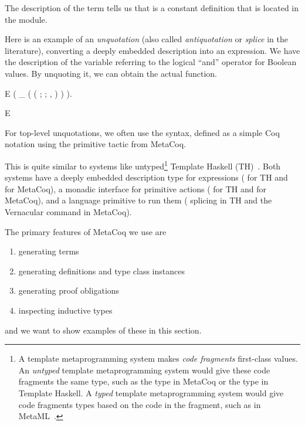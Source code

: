 The description of the term  tells us that  is a constant definition that is located in the  module.

Here is an example of an \emph{\gls{unquotation}} (also called \emph{antiquotation} or \emph{splice} in the literature), converting a deeply embedded description into an expression.
We have the  description of the variable referring to the logical ``and'' operator for Boolean values. By unquoting it, we can obtain the actual  function.

\vspace{.2in}
\begin{SaveVerbatim}{E}
 ( _ 
               ( ( \dt{[}; ; \dt{]}, ) \dt{[]})
             \fn{>>}\fn{=} ).
\end{SaveVerbatim}

\begin{SaveVerbatim}{E}
\end{SaveVerbatim}

For top-level unquotations, we often use the  syntax, defined as a simple Coq notation using the primitive tactic from MetaCoq.


\newcommand{\TemplateMonad}{\hyperref[code:TemplateMonad]{\ty{TemplateMonad}}}
This is quite similar to systems like untyped\footnote{A template \gls{metaprogramming} system makes \emph{code fragments} first-class values. An \emph{untyped} template \gls{metaprogramming} system would give these code fragments the same type, such as the  type in MetaCoq or the  type in Template Haskell. A \emph{typed} template \gls{metaprogramming} system would give code fragments types based on the code in the fragment, such as  in MetaML~\cite{taha2000metaml}.} Template Haskell (TH)~\cite{sheard2002template}. Both systems have a deeply embedded description type for expressions ( for TH and  for MetaCoq), a monadic interface for primitive actions ( for TH and \TemplateMonad\label{code:TemplateMonad} for MetaCoq), and a language primitive to run them ( splicing in TH and the  \gls{Vernacular} command in MetaCoq).

The primary features of MetaCoq we use are
\begin{enumerate}[nosep]
\item generating terms
\item generating definitions and type class instances
\item generating proof obligations
\item inspecting inductive types
\end{enumerate}
and we want to show examples of these in this section.


